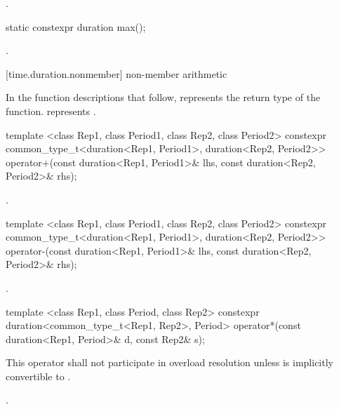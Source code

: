 \begin{itemdescr}
\pnum
\returns {}.
\end{itemdescr}

%
\begin{itemdecl}
static constexpr duration max();
\end{itemdecl}

\begin{itemdescr}
\pnum
\returns {}.
\end{itemdescr}

[time.duration.nonmember]{ non-member arithmetic}

\pnum
In the function descriptions that follow,  represents the return type
of the function.  represents .

%
\begin{itemdecl}
template <class Rep1, class Period1, class Rep2, class Period2>
  constexpr common_type_t<duration<Rep1, Period1>, duration<Rep2, Period2>>
  operator+(const duration<Rep1, Period1>& lhs, const duration<Rep2, Period2>& rhs);
\end{itemdecl}

\begin{itemdescr}
\pnum
\returns {}.
\end{itemdescr}

%
\begin{itemdecl}
template <class Rep1, class Period1, class Rep2, class Period2>
  constexpr common_type_t<duration<Rep1, Period1>, duration<Rep2, Period2>>
  operator-(const duration<Rep1, Period1>& lhs, const duration<Rep2, Period2>& rhs);
\end{itemdecl}

\begin{itemdescr}
\pnum
\returns {}.
\end{itemdescr}

%
\begin{itemdecl}
template <class Rep1, class Period, class Rep2>
  constexpr duration<common_type_t<Rep1, Rep2>, Period>
  operator*(const duration<Rep1, Period>& d, const Rep2& s);
\end{itemdecl}

\begin{itemdescr}
\pnum
\remarks This operator shall not participate in overload
resolution unless  is implicitly convertible to .

\pnum
\returns {}.
\end{itemdescr}


